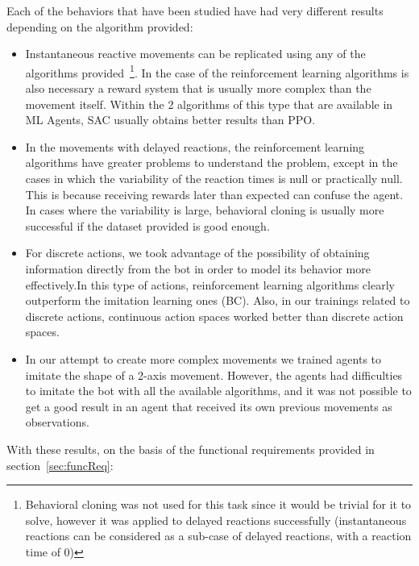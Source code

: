 Each of the behaviors that have been studied have had very different results depending on the algorithm provided:
\begin{itemize}
	\item Instantaneous reactive movements can be replicated using any of the algorithms provided~\footnote{Behavioral cloning was not used for this task since it would be trivial for it to solve, however it was applied to delayed reactions successfully (instantaneous reactions can be considered as a sub-case of delayed reactions, with a reaction time of 0)}. In the case of the reinforcement learning algorithms is also necessary a reward system that is usually more complex than the movement itself. Within the 2 algorithms of this type that are available in ML Agents, SAC usually obtains better results than PPO.
	\item In the movements with delayed reactions, the reinforcement learning algorithms have greater problems to understand the problem, except in the cases in which the variability of the reaction times is null or practically null. This is because receiving rewards later than expected can confuse the agent. In cases where the variability is large, behavioral cloning is usually more successful if the dataset provided is good enough.
	\item For discrete actions, we took advantage of the possibility of obtaining information directly from the bot in order to model its behavior more effectively.In this type of actions, reinforcement learning algorithms clearly outperform the imitation learning ones (BC). Also, in our trainings related to discrete actions, continuous action spaces worked better than discrete action spaces.
	\item In our attempt to create more complex movements we trained agents to imitate the shape of a 2-axis movement. However, the agents had difficulties to imitate the bot with all the available algorithms, and it was not possible to get a good result in an agent that received its own previous movements as observations.
\end{itemize}

With these results, on the basis of the functional requirements provided in section~\ref{sec:funcReq}:

